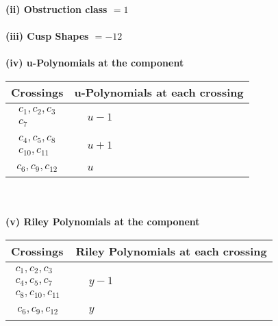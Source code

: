 \documentclass[1p]{elsarticle_modified}
\theoremstyle{definition}
\begin{document}
\flushleft \textbf{(ii) Obstruction class $= 1$}\\~\\
\flushleft \textbf{(iii) Cusp Shapes $= -12$}\\~\\
\newpage\renewcommand{\arraystretch}{1}
\flushleft \textbf{(iv) u-Polynomials at the component}\newline \\
\begin{tabular}{m{50pt}|m{274pt}}
Crossings & \hspace{64pt}u-Polynomials at each crossing \\
\hline $$\begin{aligned}c_{1},c_{2},c_{3}\\c_{7}\end{aligned}$$&$\begin{aligned}
&u-1
\end{aligned}$\\
\hline $$\begin{aligned}c_{4},c_{5},c_{8}\\c_{10},c_{11}\end{aligned}$$&$\begin{aligned}
&u+1
\end{aligned}$\\
\hline $$\begin{aligned}c_{6},c_{9},c_{12}\end{aligned}$$&$\begin{aligned}
&u
\end{aligned}$\\
\hline
\end{tabular}\\~\\
\newpage\renewcommand{\arraystretch}{1}
\flushleft \textbf{(v) Riley Polynomials at the component}\newline \\
\begin{tabular}{m{50pt}|m{274pt}}
Crossings & \hspace{64pt}Riley Polynomials at each crossing \\
\hline $$\begin{aligned}c_{1},c_{2},c_{3}\\c_{4},c_{5},c_{7}\\c_{8},c_{10},c_{11}\end{aligned}$$&$\begin{aligned}
&y-1
\end{aligned}$\\
\hline $$\begin{aligned}c_{6},c_{9},c_{12}\end{aligned}$$&$\begin{aligned}
&y
\end{aligned}$\\
\hline
\end{tabular}\\~\\
\end{document}
